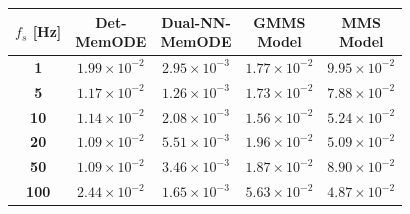 \documentclass[lettersize,journal]{IEEEtran}
\begin{document}
\begin{table}
\begin{tabular}{c|cccc}
    \midrule
    \(f_s\) [Hz] & \makecell{Det-                                                                                                                                                                        \\MemODE}             & \makecell{Dual-NN-                                                                                                             \\ MemODE}                 & \makecell{GMMS\\Model}             & \makecell{MMS\\Model}                                        \\
    \midrule
    \textbf{1}   & \(1.99 \times 10^{-2}\) & \color{ieeegreen} \bfseries \(2.95 \times 10^{-3}\) & \(1.77 \times 10^{-2}\)                           & \color{ieeered} \bfseries \(9.95 \times 10^{-2}\) \\
    \textbf{5}   & \(1.17 \times 10^{-2}\) & \color{ieeegreen} \bfseries \(1.26 \times 10^{-3}\) & \(1.73 \times 10^{-2}\)                           & \color{ieeered} \bfseries \(7.88 \times 10^{-2}\) \\
    \textbf{10}  & \(1.14 \times 10^{-2}\) & \color{ieeegreen} \bfseries \(2.08 \times 10^{-3}\) & \(1.56 \times 10^{-2}\)                           & \color{ieeered} \bfseries \(5.24 \times 10^{-2}\) \\
    \textbf{20}  & \(1.09 \times 10^{-2}\) & \color{ieeegreen} \bfseries \(5.51 \times 10^{-3}\) & \(1.96 \times 10^{-2}\)                           & \color{ieeered} \bfseries \(5.09 \times 10^{-2}\) \\
    \textbf{50}  & \(1.09 \times 10^{-2}\) & \color{ieeegreen} \bfseries \(3.46 \times 10^{-3}\) & \(1.87 \times 10^{-2}\)                           & \color{ieeered} \bfseries \(8.90 \times 10^{-2}\) \\
    \textbf{100} & \(2.44 \times 10^{-2}\) & \color{ieeegreen} \(1.65 \times 10^{-3}\)           & \color{ieeered} \bfseries \(5.63 \times 10^{-2}\) & \(4.87 \times 10^{-2}\)                           \\
    \bottomrule
  \end{tabular}
\end{table}
\end{document}
